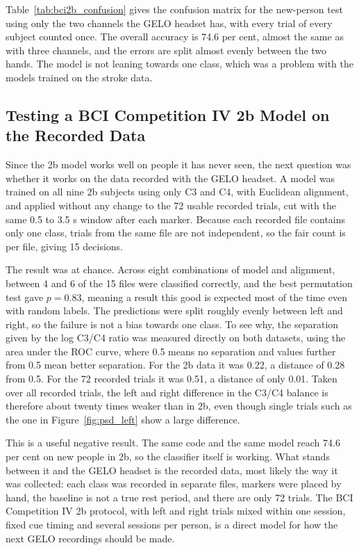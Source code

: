Table~\ref{tab:bci2b_confusion} gives the confusion matrix for the new-person test using
only the two channels the GELO headset has, with every trial of every subject counted
once. The overall accuracy is 74.6 per cent, almost the same as with three channels, and
the errors are split almost evenly between the two hands. The model is not leaning
towards one class, which was a problem with the models trained on the stroke data.

\FloatBarrier

\subsection{Testing a BCI Competition IV 2b Model on the Recorded Data}

Since the 2b model works well on people it has never seen, the next question was whether
it works on the data recorded with the GELO headset. A model was trained on all nine 2b
subjects using only C3 and C4, with Euclidean alignment, and applied without any change
to the 72 usable recorded trials, cut with the same 0.5 to 3.5 s window after each marker.
Because each recorded file contains only one class, trials from the same file are not
independent, so the fair count is per file, giving 15 decisions.

The result was at chance. Across eight combinations of model and alignment, between 4 and
6 of the 15 files were classified correctly, and the best permutation test gave
$p = 0.83$, meaning a result this good is expected most of the time even with random
labels. The predictions were split roughly evenly between left and right, so the failure
is not a bias towards one class. To see why, the separation given by the log C3/C4 ratio
was measured directly on both datasets, using the area under the ROC curve, where 0.5
means no separation and values further from 0.5 mean better separation. For the 2b data
it was 0.22, a distance of 0.28 from 0.5. For the 72 recorded trials it was 0.51, a
distance of only 0.01. Taken over all recorded trials, the left and right difference in
the C3/C4 balance is therefore about twenty times weaker than in 2b, even though single
trials such as the one in Figure~\ref{fig:psd_left} show a large difference.

This is a useful negative result. The same code and the same model reach 74.6 per cent on
new people in 2b, so the classifier itself is working. What stands between it and the
GELO headset is the recorded data, most likely the way it was collected: each class was
recorded in separate files, markers were placed by hand, the baseline is not a true rest
period, and there are only 72 trials. The BCI Competition IV 2b protocol, with left and
right trials mixed within one session, fixed cue timing and several sessions per person,
is a direct model for how the next GELO recordings should be made.

